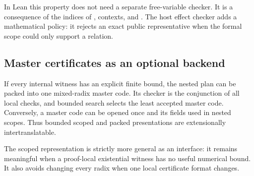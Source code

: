 In Lean this property does not need a separate free-variable checker.  It is a
consequence of the indices of , contexts, and .  The
host effect checker adds a mathematical policy: it rejects an exact public
representative when the formal scope could only support a relation.

\subsection{Master certificates as an optional backend}

If every internal witness has an explicit finite bound, the nested plan can be
packed into one mixed-radix master code.  Its checker is the conjunction of all
local checks, and bounded search selects the least accepted master code.
Conversely, a master code can be opened once and its fields used in nested
scopes.  Thus bounded scoped and packed presentations are extensionally
intertranslatable.

The scoped representation is strictly more general as an interface: it remains
meaningful when a proof-local existential witness has no useful numerical
bound.  It also avoids changing every radix when one local certificate format
changes.
